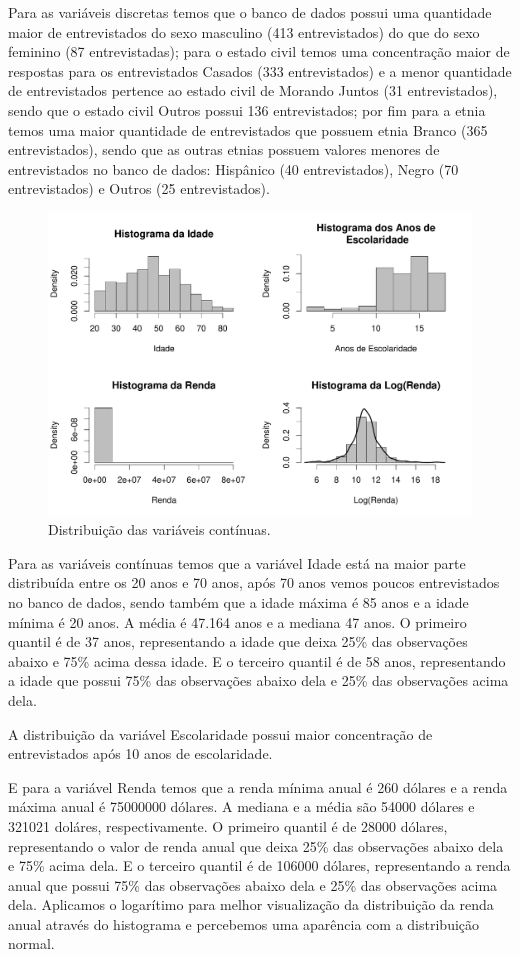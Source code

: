 \documentclass[]{article}
\begin{document}
Para as variáveis discretas temos que o banco de dados possui uma
quantidade maior de entrevistados do sexo masculino (413 entrevistados)
do que do sexo feminino (87 entrevistadas); para o estado civil temos
uma concentração maior de respostas para os entrevistados Casados (333
entrevistados) e a menor quantidade de entrevistados pertence ao estado
civil de Morando Juntos (31 entrevistados), sendo que o estado civil
Outros possui 136 entrevistados; por fim para a etnia temos uma maior
quantidade de entrevistados que possuem etnia Branco (365
entrevistados), sendo que as outras etnias possuem valores menores de
entrevistados no banco de dados: Hispânico (40 entrevistados), Negro (70
entrevistados) e Outros (25 entrevistados).

\begin{figure}[H]

{\centering \includegraphics[width=0.6\linewidth]{p101-graf} 

}

\caption{Distribuição das variáveis contínuas.}\label{fig:unnamed-chunk-7}
\end{figure}

Para as variáveis contínuas temos que a variável Idade está na maior
parte distribuída entre os 20 anos e 70 anos, após 70 anos vemos poucos
entrevistados no banco de dados, sendo também que a idade máxima é 85
anos e a idade mínima é 20 anos. A média é 47.164 anos e a mediana 47
anos. O primeiro quantil é de 37 anos, representando a idade que deixa
25\% das observações abaixo e 75\% acima dessa idade. E o terceiro
quantil é de 58 anos, representando a idade que possui 75\% das
observações abaixo dela e 25\% das observações acima dela.

A distribuição da variável Escolaridade possui maior concentração de
entrevistados após 10 anos de escolaridade.

E para a variável Renda temos que a renda mínima anual é 260 dólares e a
renda máxima anual é 75000000 dólares. A mediana e a média são 54000
dólares e 321021 doláres, respectivamente. O primeiro quantil é de 28000
dólares, representando o valor de renda anual que deixa 25\% das
observações abaixo dela e 75\% acima dela. E o terceiro quantil é de
106000 dólares, representando a renda anual que possui 75\% das
observações abaixo dela e 25\% das observações acima dela. Aplicamos o
logarítimo para melhor visualização da distribuição da renda anual
através do histograma e percebemos uma aparência com a distribuição
normal.
\end{document}
